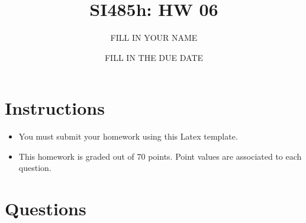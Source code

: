 \documentclass{article}[9pt]
\title{SI485h: HW 06}
\date{FILL IN THE DUE DATE}
\author{FILL IN YOUR NAME}
\begin{document}
\maketitle
\section*{Instructions}

\begin{itemize}
\item You must submit your homework using this Latex template.
  
\item This homework is graded out of 70 points. Point values are associated to each question.
\end{itemize}

\section*{Questions}
\label{sec:org24d21ef}
\end{document}
